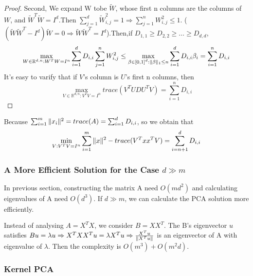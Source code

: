 \begin{lemma}
\begin{proof}
        Second, We expand W tobe $ \tilde{W} $, whose first n columns are the columns of $ W $, and $ \tilde{W}^T \tilde{W} = I^d $.Then $ \sum^{d}_{j=1} \tilde{W}^2_{i,j} = 1 \Rightarrow \sum^{n}_{j=1} W^2_{i,j} \le 1$. ($ (\tilde{W} \tilde{W}^T - I^d) \tilde{W} = 0 \Rightarrow  \tilde{W} \tilde{W}^T = I^d$).Then,if $ D_{1,1} \ge D_{2,2} \ge \ldots \ge D_{d,d} $,
        \[
            \max_{W \in \mathbb{R}^{d,n}: W^T W = I^n} \sum^{d}_{i=1} D_{i,i} \sum^{n}_{j=1} W^2_{i,j} \le \max_{\beta \in {[0, 1]}^d: \Arrowvert \beta \Arrowvert_1 \le n} \sum^{d}_{i=1} D_{i,i} \beta_{i} = \sum^{n}_{i=1} D_{i,i}
        \]
        It's easy to varify that if $ V $'s column is $ U $'s first n columns, then 
        \[
            \max_{V \in \mathbb{R}^{d,n}: V^T V = I^n} trace\left( V^T U D U^T V \right) = \sum^{n}_{i=1} D_{i,i}
        \]
    \end{proof}
\end{lemma}

Because $ \sum^{m}_{i=1} \Arrowvert x_i \Arrowvert^2 = trace(A) = \sum^{d}_{i=1} D_{i,i} $, so we obtain that
\[
    \min_{V: V^T V = I^n} \sum^{m}_{i=1} \Arrowvert x \Arrowvert^2 - trace(V^T x x^T V) = \sum^{d}_{i = n+1} D_{i,i}
\]

\subsubsection{A More Efficient Solution for the Case $ d \gg m $}%

In previous section, constructing the matrix A need $ O(md^2) $ and calculating eigenvalues of A need $ O(d^3) $.
If $ d \gg m $, we can calculate the PCA solution more efficiently.

Instead of analysing $ A = X^T X $, we consider $ B = XX^T $. The B's eigenvector $ u $ satisfies $ B u = \lambda u \Rightarrow X^T X X^T u = \lambda X^T u \Rightarrow \frac{X^T u}{ \Arrowvert X^T u \Arrowvert} $ is an eigenvector of A with eigenvalue of $ \lambda $. Then the complexity is $ O(m^3) + O(m^2 d) $.

\subsubsection{Kernel PCA}%

